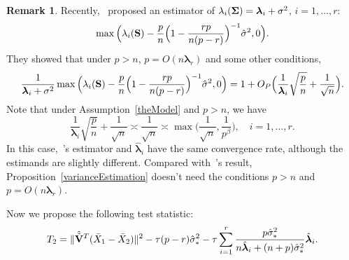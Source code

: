 \documentclass[3p]{elsarticle}
\newcommand{\bfsym}[1]{\ensuremath{\boldsymbol{#1}}}
\def\blambda {\bfsym {\lambda}}        \def\bLambda {\bfsym {\Lambda}}
\theoremstyle{plain}
\theoremstyle{definition}
\newtheorem{remark}{\quad\quad Remark}
\theoremstyle{remark}
\begin{document}
\begin{remark}
    Recently,~\cite{Fan2015Asymptotics} proposed an estimator of
    $\lambda_i(\bSigma)=\blambda_i+\sigma^2$, $i=1,\ldots, r$:
    $$
    \max\Big(\lambda_i(\mathbf{S})-\frac{p}{n}\Big(1-\frac{rp}{n(p-r)}\Big)^{-1}\hat{\sigma}^2,0\Big).
    $$
    They showed that under $p>n$, $p=O(n\blambda_r)$ and some other conditions,
    $$
    \frac{1}{\blambda_i+\sigma^2}\max\Big(\lambda_i(\BS)-\frac{p}{n}\Big(1-\frac{rp}{n(p-r)}\Big)^{-1}\hat{\sigma}^2,0\Big)
    =1+O_P\Big(\frac{1}{\blambda_i}\sqrt{\frac{p}{n}}+\frac{1}{\sqrt{n}}\Big).
    $$
    Note that under Assumption~\ref{theModel} and $p>n$, we have
    $$
\frac{1}{\blambda_i}\sqrt{\frac{p}{n}}+\frac{1}{\sqrt{n}}\asymp
\frac{1}{\sqrt{n}}
\asymp
        \max\big(\frac{1}{\sqrt{n}},\frac{1}{p^{\beta}}\big),\quad i=1,\ldots,r.
    $$
    In this case,~\cite{Fan2015Asymptotics}'s estimator and $\hat{\blambda}_i$ have the same convergence rate, although the estimands are slightly different.
    Compared with~\cite{Fan2015Asymptotics}'s result, Proposition~\ref{varianceEstimation} doesn't need the conditions $p>n$ and $p=O(n\blambda_r)$.
\end{remark}


Now we propose the following test statistic:
$$
T_2=
\|\hat{\tilde{\BV}}^T (\bar{X}_1-\bar{X}_2)\|^2
-
\tau(p-r)\hat{\sigma}_*^2 
- \tau\sum_{i=1}^r \frac{p\hat{\sigma}_*^2}{n\hat{\blambda}_i+(n+p)\hat{\sigma}_*^2}\hat{\blambda}_i.
$$
\end{document}
